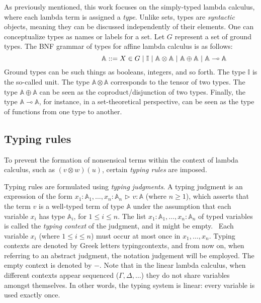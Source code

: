 As previously mentioned, this work focuses on the simply-typed lambda calculus, where each lambda term is assigned a \emph{type}. Unlike sets, types are \emph{syntactic} objects, meaning they can be discussed independently of their elements. One can conceptualize types as names or labels for a set. Let $G$ represent a set of ground types. The BNF grammar of types for affine lambda calculus is as follows:
\begin{equation*} \label{eq:grammartypes}
\centering
\hspace{95pt} \mathbb{A} ::= X \in G \hspace{3 pt} \vert \hspace{3 pt} \mathbb{I}  \hspace{3 pt}  \vert \hspace{3 pt} \mathbb{A}  \otimes  \mathbb{A} \hspace{3 pt}  \vert \hspace{3 pt} \mathbb{A}  \oplus  \mathbb{A} \hspace{3 pt} \vert  \hspace{3 pt}  \mathbb{A} \multimap  \mathbb{A}
\end{equation*}
 Ground types can be such things as booleans, integers, and so forth. The type $\mathbb{I}$ is the so-called unit. The type $\mathbb{A} \otimes \mathbb{A}$ corresponds to the tensor of two types. The type $\mathbb{A} \oplus \mathbb{A}$ can be seen as the coproduct/disjunction of two types. Finally, the type $\mathbb{A} \multimap \mathbb{A}$, for instance, in a set-theoretical perspective, can be seen as the type of functions from one type to another.


\subsection{Typing rules}

To prevent the formation of nonsensical terms within the context of lambda calculus, such as $(v \otimes w) (u)$, certain \emph{typing rules} are imposed.

Typing rules are formulated using \emph{typing judgments}. A typing judgment is an expression of the form $x_{1}: \mathbb{A}_{1}, \ldots, x_{n}: \mathbb{A}_{n} \hspace{1pt} \triangleright \hspace{1pt} v: \mathbb{A}$ (where $n \geq 1$), which asserts that the term $v$ is a well-typed term of type $\mathbb{A}$ under the assumption that each variable $x_{i}$ has type $\mathbb{A}_{i}$, for $1 \leq i \leq n$. The list $x_{1}: \mathbb{A}_{1}, \ldots, x_{n}: \mathbb{A}_{n}$ of typed variables is called the \emph{typing context} of the judgment, and it might be empty.  Each variable $x_i$ (where $1 \leq i \leq n$) must occur at most once in $x_1, \ldots, x_n$. Typing contexts are denoted by Greek letters \gls{typingcontexts}, and from now on, when referring to an abstract judgment, the notation \gls{judgement} will be employed.
The empty context is denoted by $-$. Note that in the linear lambda calculus, when different contexts appear sequenced (\eg $\Gamma, \Delta, \ldots$) they do not share variables amongst themselves. In other words, the typing system is linear: every variable is used exactly once.

